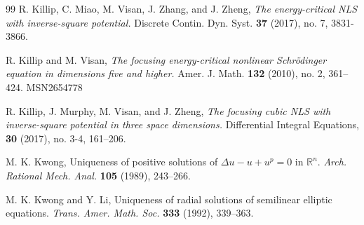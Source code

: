 \documentclass[12pt]{amsart}
\begin{document}
\begin{thebibliography}{99}
 R. Killip, C. Miao, M. Visan, J. Zhang,
and J. Zheng, \emph{The energy-critical NLS with inverse-square potential.}
Discrete Contin. Dyn. Syst. {\bf 37} (2017), no. 7, 3831-3866.

 R. Killip and M. Visan, \emph{The
focusing energy-critical nonlinear Schr\"{o}dinger equation in dimensions
five and higher.} Amer. J. Math. \textbf{132} (2010), no. 2, 361--424.
MSN{2654778}


%
%
%




 R. Killip, J. Murphy, M. Visan, and J. Zheng, \emph{The focusing cubic NLS with inverse-square potential in three space dimensions.} Differential Integral Equations, \textbf{30} (2017), no. 3-4, 161--206.

{\sc M. K. Kwong,}
Uniqueness of positive solutions of $\Delta u-u+u^p=0$ in $\mathbb{R}^n$.
{\it Arch. Rational Mech. Anal.} {\bf 105} (1989), 243--266.

{\sc M. K. Kwong and Y. Li,} Uniqueness of radial solutions of semilinear elliptic equations.
{\it Trans. Amer. Math. Soc.} {\bf 333} (1992), 339--363.


\end{thebibliography}
\end{document}
